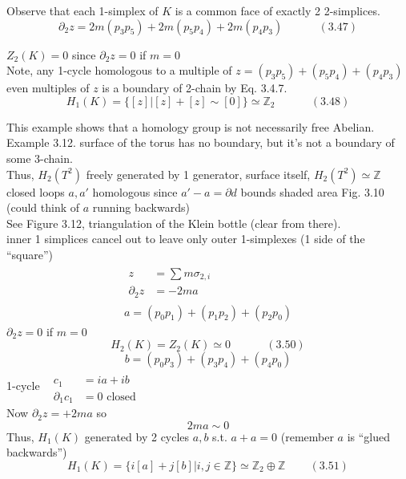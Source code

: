 \documentclass[twoside]{amsart}
\begin{document}
Observe that each 1-simplex of $K$ is a common face of exactly 2 2-simplices.  
\begin{equation}
  \partial_2 z = 2m (p_3 p_5) + 2m (p_5 p_4) + 2m (p_4 p_3) \quad \quad \quad \, (3.47)
\end{equation}

$Z_2(K) =0$ since $\partial_2 z = 0$ if $m=0$ \\
Note, any 1-cycle homologous to a multiple of $z = (p_3 p_5) + (p_5 p_4) + (p_4 p_3)$ \\
even multiples of $z$ is a boundary of 2-chain by Eq. 3.4.7.  
\begin{equation}
  H_1(K) = \lbrace [z] | [z] + [z] \sim [0] \rbrace \simeq \mathbb{Z}_2 \quad \quad \quad \, (3.48)
\end{equation}

This example shows that a homology group is not necessarily free Abelian.   \\

Example 3.12. surface of the torus has no boundary, but it's not a boundary of some 3-chain.  \\
Thus, $H_2(T^2)$ freely generated by 1 generator, surface itself, $H_2(T^2) \simeq \mathbb{Z}$ \\
closed loops $a,a'$ homologous since $a'-a = \partial d$ bounds shaded area Fig. 3.10 (could think of $a$ running backwards) \\
See Figure 3.12, triangulation of the Klein bottle (clear from there). \\
inner 1 simplices cancel out to leave only outer 1-simplexes (1 side of the ``square'')
\[
\begin{gathered}
  \begin{aligned}
    z & = \sum m \sigma_{2,i} \\ 
    \partial_2 z & = -2ma  \end{aligned} \\ 
  a = (p_0 p_1 ) + (p_1 p_2 ) + ( p_2 p_0)
\end{gathered}
\]
$\partial_2z =0$ if $m=0$ 
\begin{equation}
  H_2(K) = Z_2(K) \simeq 0 \quad \quad \quad \, (3.50)
\end{equation}
\[
b = (p_0 p_3) + (p_3 p_4) + (p_4p_0)
\]
1-cycle \, $\begin{aligned} & \quad \\ 
  c_1 & = ia + ib \\
  \partial_1 c_1 & = 0 \text{ closed } \end{aligned}$ \\
Now $\partial_2 z = + 2 m a$ so 
\[
2ma \sim 0
\]
Thus, $H_1(K)$ generated by 2 cycles $a,b$ s.t. $a+a =0$ (remember $a$ is ``glued backwards'')
\begin{equation}
  H_1(K) = \lbrace i [a] + j[b] | i,j \in \mathbb{Z} \rbrace \simeq \mathbb{Z}_2 \oplus \mathbb{Z} \quad \quad \, (3.51) 
\end{equation}
\end{document}
